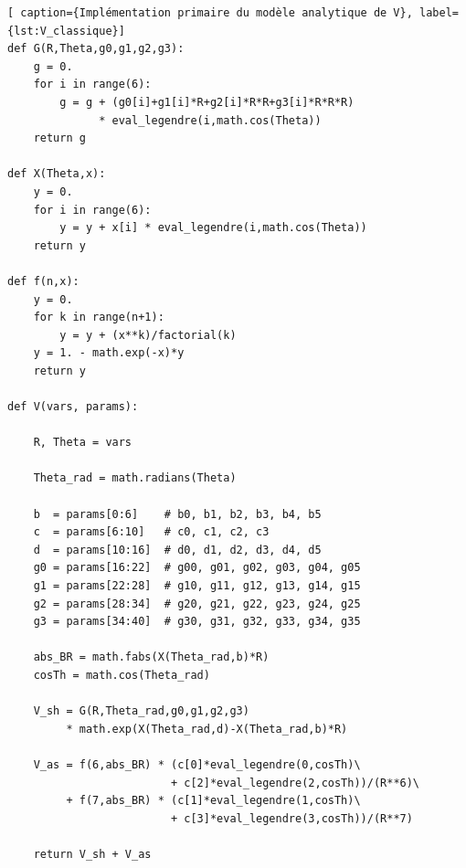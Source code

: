 \documentclass[11pt, a4paper, openany]{report}
\begin{document}
\begin{lstlisting}[ caption={Implémentation primaire du modèle analytique de V}, label={lst:V_classique}]
def G(R,Theta,g0,g1,g2,g3):
    g = 0.
    for i in range(6):
        g = g + (g0[i]+g1[i]*R+g2[i]*R*R+g3[i]*R*R*R)
              * eval_legendre(i,math.cos(Theta))
    return g

def X(Theta,x):
    y = 0.
    for i in range(6):
        y = y + x[i] * eval_legendre(i,math.cos(Theta))
    return y

def f(n,x):
    y = 0.
    for k in range(n+1):
        y = y + (x**k)/factorial(k)
    y = 1. - math.exp(-x)*y
    return y

def V(vars, params):

    R, Theta = vars

    Theta_rad = math.radians(Theta)

    b  = params[0:6]    # b0, b1, b2, b3, b4, b5
    c  = params[6:10]   # c0, c1, c2, c3
    d  = params[10:16]  # d0, d1, d2, d3, d4, d5
    g0 = params[16:22]  # g00, g01, g02, g03, g04, g05
    g1 = params[22:28]  # g10, g11, g12, g13, g14, g15
    g2 = params[28:34]  # g20, g21, g22, g23, g24, g25
    g3 = params[34:40]  # g30, g31, g32, g33, g34, g35
        
    abs_BR = math.fabs(X(Theta_rad,b)*R)
    cosTh = math.cos(Theta_rad)
        
    V_sh = G(R,Theta_rad,g0,g1,g2,g3) 
         * math.exp(X(Theta_rad,d)-X(Theta_rad,b)*R)
        
    V_as = f(6,abs_BR) * (c[0]*eval_legendre(0,cosTh)\
                         + c[2]*eval_legendre(2,cosTh))/(R**6)\
         + f(7,abs_BR) * (c[1]*eval_legendre(1,cosTh)\
                         + c[3]*eval_legendre(3,cosTh))/(R**7)
        
    return V_sh + V_as
\end{lstlisting}
\end{document}
